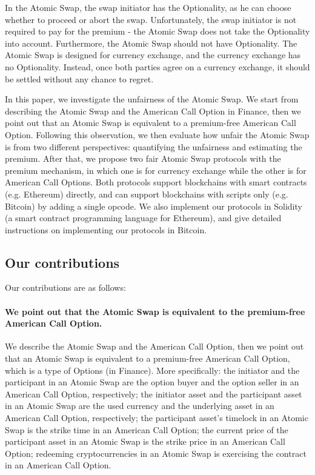 In the Atomic Swap, the swap initiator has the Optionality, as he can choose whether to proceed or abort the swap.
Unfortunately, the swap initiator is not required to pay for the premium - the Atomic Swap does not take the Optionality into account.
Furthermore, the Atomic Swap should not have Optionality.
The Atomic Swap is designed for currency exchange, and the currency exchange has no Optionality.
Instead, once both parties agree on a currency exchange, it should be settled without any chance to regret.

In this paper, we investigate the unfairness of the Atomic Swap.
We start from describing the Atomic Swap and the American Call Option in Finance,
then we point out that an Atomic Swap is equivalent to a premium-free American Call Option.
Following this observation, we then evaluate how unfair the Atomic Swap is from two different perspectives:
quantifying the unfairness and estimating the premium.
After that, we propose two fair Atomic Swap protocols with the premium mechanism, in which one is for currency exchange while the other is for American Call Options.
Both protocols support blockchains with smart contracts (e.g. Ethereum) directly, and can support blockchains with scripts only (e.g. Bitcoin) by adding a single opcode.
We also implement our protocols in Solidity (a smart contract programming language for Ethereum), and give detailed instructions on implementing our protocols in Bitcoin.

\subsection{Our contributions}

Our contributions are as follows:

\paragraph{We point out that the Atomic Swap is equivalent to the premium-free American Call Option.}
We describe the Atomic Swap and the American Call Option,
then we point out that an Atomic Swap is equivalent to a premium-free American Call Option, which is a type of Options (in Finance).
More specifically:
the initiator and the participant in an Atomic Swap are the option buyer and the option seller in an American Call Option, respectively;
the initiator asset and the participant asset in an Atomic Swap are the used currency and the underlying asset in an American Call Option, respectively;
the participant asset's timelock in an Atomic Swap is the strike time in an American Call Option;
the current price of the participant asset in an Atomic Swap is the strike price in an American Call Option;
redeeming cryptocurrencies in an Atomic Swap is exercising the contract in an American Call Option.

